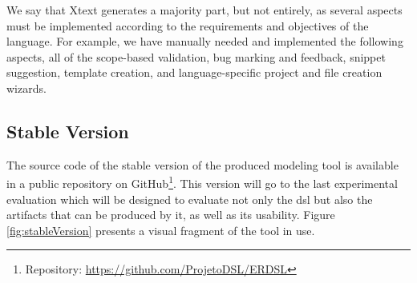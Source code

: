 We say that Xtext generates a majority part, but not entirely, as several aspects must be implemented according to the requirements and objectives of the language.
For example, we have manually needed and implemented the following aspects, all of the scope-based validation, bug marking and feedback, snippet suggestion, template creation, and language-specific project and file creation wizards.

\subsection{Stable Version}

The source code of the stable version of the produced modeling tool is available in a public repository on GitHub\footnote{Repository: \url{https://github.com/ProjetoDSL/ERDSL}}.
This version will go to the last experimental evaluation which will be designed to evaluate not only the \ac{dsl} but also the artifacts that can be produced by it, as well as its usability.
Figure \ref{fig:stableVersion} presents a visual fragment of the tool in use.

